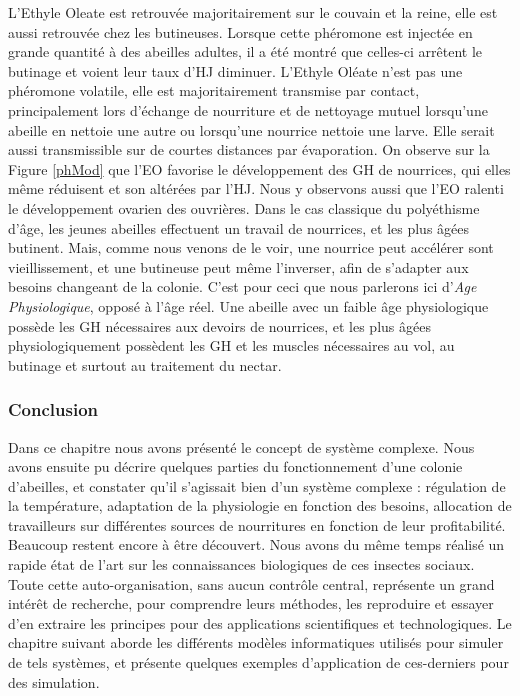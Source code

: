 			 L'Ethyle Oleate est retrouvée majoritairement sur le couvain et la reine, elle est aussi retrouvée chez les butineuses. Lorsque cette phéromone est injectée en grande quantité à des abeilles adultes, il a été montré que celles-ci arrêtent le butinage et voient leur taux d'HJ diminuer. L'Ethyle Oléate n'est pas une phéromone volatile, elle est majoritairement transmise par contact, principalement lors d'échange de nourriture et de nettoyage mutuel lorsqu'une abeille en nettoie une autre ou lorsqu'une nourrice nettoie une larve. Elle serait aussi transmissible sur de courtes distances par évaporation. On observe sur la Figure \ref{phMod} que l'EO favorise le développement des GH de nourrices, qui elles même réduisent et son altérées par l'HJ. Nous y observons aussi que l'EO ralenti le développement ovarien des ouvrières. Dans le cas classique du polyéthisme d'âge, les jeunes abeilles effectuent un travail de nourrices, et les plus âgées butinent. Mais, comme nous venons de le voir, une nourrice peut accélérer sont vieillissement, et une butineuse peut même l'inverser, afin de s'adapter aux besoins changeant de la colonie. C'est pour ceci que nous parlerons ici d'\textit{Age Physiologique}, opposé à l'âge réel. Une abeille avec un faible âge physiologique possède les GH nécessaires aux devoirs de nourrices, et les plus âgées physiologiquement possèdent les GH et les muscles nécessaires au vol, au butinage et surtout au traitement du nectar.
			
		\subsubsection{Conclusion}
			
		Dans ce chapitre nous avons présenté le concept de système complexe. Nous avons ensuite pu décrire quelques parties du fonctionnement d'une colonie d'abeilles, et constater qu'il s'agissait bien d'un système complexe : régulation de la température, adaptation de la physiologie en fonction des besoins, allocation de travailleurs sur différentes sources de nourritures en fonction de leur profitabilité. Beaucoup restent encore à être découvert. Nous avons du même temps réalisé un rapide état de l'art sur les connaissances biologiques de ces insectes sociaux. Toute cette auto-organisation, sans aucun contrôle central, représente un grand intérêt de recherche, pour comprendre leurs méthodes, les reproduire et essayer d'en extraire les principes pour des applications scientifiques et technologiques. Le chapitre suivant aborde les différents modèles informatiques utilisés pour simuler de tels systèmes, et présente quelques exemples d'application de ces-derniers pour des simulation.